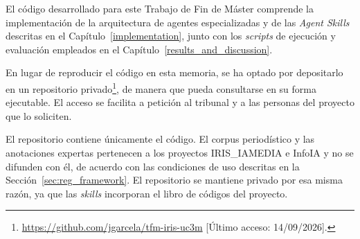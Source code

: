 
El código desarrollado para este Trabajo de Fin de Máster comprende la
implementación de la arquitectura de agentes especializadas y de las
\textit{Agent Skills} descritas en el Capítulo~\ref{implementation}, junto con los
\textit{scripts} de ejecución y evaluación empleados en el
Capítulo~\ref{results_and_discussion}.

En lugar de reproducir el código en esta memoria, se ha optado por depositarlo en
un repositorio privado\footnote{\url{https://github.com/jgarcela/tfm-iris-uc3m}
[Último acceso: 14/09/2026].}, de manera que pueda consultarse en su forma
ejecutable. El acceso se facilita a petición al tribunal y a las personas del
proyecto que lo soliciten.

El repositorio contiene únicamente el código. El corpus periodístico y las
anotaciones expertas pertenecen a los proyectos IRIS\_IAMEDIA e InfoIA y no se
difunden con él, de acuerdo con las condiciones de uso descritas en la
Sección~\ref{sec:reg_framework}. El repositorio se mantiene privado por esa
misma razón, ya que las \textit{skills} incorporan el libro de códigos del proyecto.
